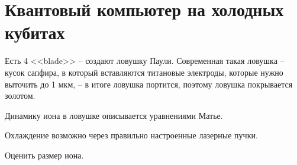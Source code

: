 \section{Квантовый компьютер на холодных кубитах} 



Есть 4 <<blade>> -- создают ловушку Паули. Современная такая ловушка -- кусок сапфира, в который вставляются титановые электроды, которые нужно выточить до 1 мкм, -- в итоге ловушка портится, поэтому ловушка покрывается золотом. 

Динамику иона в ловушке описывается уравнениями Матье. 


Охлаждение возможно через правильно настроенные лазерные пучки. 





\begin{hw1}
    Оценить размер иона.
\end{hw1}

 